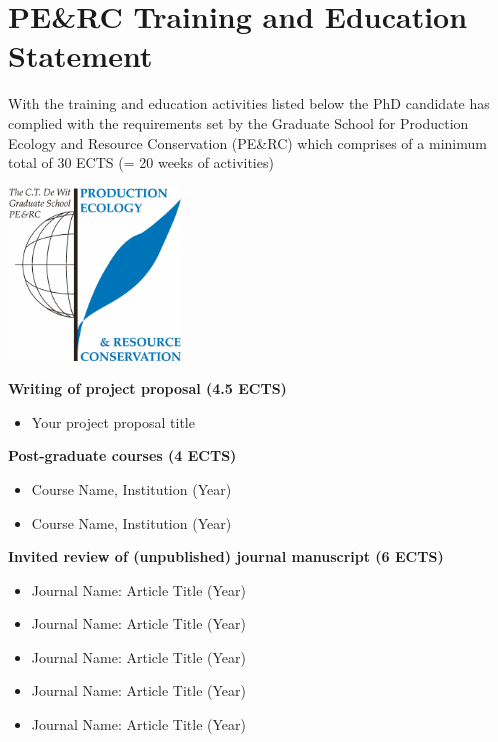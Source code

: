 \chapter{PE\&RC Training and Education Statement}

\begin{minipage}[c]{.55\textwidth}

With the training and education activities listed below the PhD candidate has complied with the requirements set by the Graduate School for Production Ecology and Resource Conservation (PE\&RC) which comprises of a minimum total of 30 ECTS (= 20 weeks of activities) 
\end{minipage}
\begin{minipage}[c]{.35\textwidth}
\begin{flushright}
\vspace{0pt}\includegraphics[width=4.6cm,height=4.6cm]{PERC_logo.pdf}
\end{flushright}
\end{minipage}

\bigskip

\textbf{Writing of project proposal (4.5 ECTS)}
\begin{itemize}[nolistsep]
    \item Your project proposal title
\end{itemize}

\textbf{Post-graduate courses (4 ECTS)}
\begin{itemize}[nolistsep]
    \item Course Name, Institution (Year)
    \item Course Name, Institution (Year)
\end{itemize}

\textbf{Invited review of (unpublished) journal manuscript (6 ECTS)}
\begin{itemize}[nolistsep]
    \item Journal Name: Article Title (Year)
    \item Journal Name: Article Title (Year)
    \item Journal Name: Article Title (Year)
    \item Journal Name: Article Title (Year)
    \item Journal Name: Article Title (Year)
\end{itemize}

